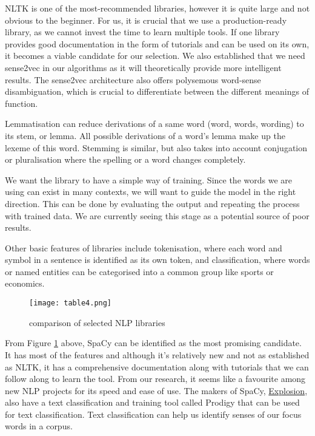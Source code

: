 \documentclass[12pt, usenames, dvipsnames]{report}
\begin{document}
\begin{flushleft}
NLTK is one of the most-recommended libraries, however it is quite large and not obvious to the beginner.
For us, it is crucial that we use a production-ready library, as we cannot invest the time to learn multiple tools.
If one library provides good documentation in the form of tutorials and can be used on its own, it becomes a viable candidate for our selection.
We also established that we need sense2vec in our algorithms as it will theoretically provide more intelligent results.
The sense2vec architecture also offers polysemous word-sense disambiguation, which is crucial to differentiate between the different meanings of function.

Lemmatisation can reduce derivations of a same word (word, words, wording) to its stem, or lemma.
All possible derivations of a word’s lemma make up the lexeme of this word.
Stemming is similar, but also takes into account conjugation or pluralisation where the spelling or a word changes completely.

We want the library to have a simple way of training.
Since the words we are using can exist in many contexts, we will want to guide the model in the right direction.
This can be done by evaluating the output and repeating the process with trained data.
We are currently seeing this stage as a potential source of poor results.

Other basic features of libraries include tokenisation, where each word and symbol in a sentence is identified as its own token, and classification, where words or named entities can be categorised into a common group like sports or economics.

\vspace*{1.2em}
\begin{figure}[!htbp]
  \hspace*{-3.666em}
  \texttt{[image: table4.png]}
  \caption{comparison of selected NLP libraries}
  \label{tab:table4}
\end{figure}
\vspace*{1.2em}

From Figure \ref{tab:table4} above, SpaCy can be identified as the most promising candidate.
It has most of the features and although it’s relatively new and not as established as NLTK, it has a comprehensive documentation along with tutorials that we can follow along to learn the tool.
From our research, it seems like a favourite among new NLP projects for its speed and ease of use.
The makers of SpaCy, \href{https://explosion.ai}{Explosion}, also have a text classification and training tool called Prodigy that can be used for text classification.
Text classification can help us identify senses of our focus words in a corpus.


\end{flushleft}
\end{document}
